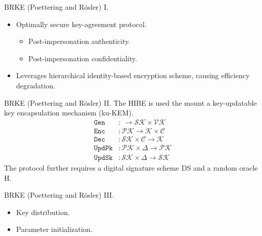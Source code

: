 \documentclass{beamer}
\begin{document}
\begin{frame}{BRKE (Poettering and Rösler) I.}
  \begin{itemize}
  \item Optimally secure key-agreement protocol.
    \begin{itemize}
    \item Post-impersonation authenticity.
    \item Post-impersonation confidentiality.
    \end{itemize}
  \item Leverages hierarchical identity-based encryption scheme,
    causing efficiency degradation.
  \end{itemize}
\end{frame}

\begin{frame}{BRKE (Poettering and Rösler) II.}
  The HIBE is used the mount a key-updatable key encapsulation mechanism (ku-KEM).
  \begin{align*}
    \texttt{Gen} & : \ \rightarrow \mathcal{SK} \times \mathcal{VK} \\
    \texttt{Enc} & : \mathcal{PK} \rightarrow \mathcal{K} \times \mathcal{C} \\ 
    \texttt{Dec} & : \mathcal{SK} \times \mathcal{C} \rightarrow \mathcal{K} \\
    \texttt{UpdPk} & : \mathcal{PK} \times \Delta \rightarrow \mathcal{PK} \\
    \texttt{UpdSk} & : \mathcal{SK} \times \Delta \rightarrow \mathcal{SK}
  \end{align*}
  The protocol further requires a digital signature scheme DS and a random
  oracle H.
\end{frame}

\begin{frame}{BRKE (Poettering and Rösler) III.}
  \scriptsize
   \begin{minipage}[h]{0.59\textwidth}
      \begin{figure}[h]
        \centering
        \setlength{\fboxsep}{10pt}
        \scalebox{0.7}{%
        \fbox{%
          
        }
      }
    \end{figure}
    \end{minipage}
   \begin{minipage}[h]{0.40\textwidth}
      \begin{itemize}
      \item Key distribution.
      \item Parameter initialization.
      \end{itemize}
  \end{minipage}
\end{frame}
\end{document}
